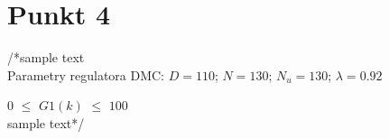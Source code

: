 \chapter{Punkt 4}

/*sample text\\
Parametry regulatora DMC: $D=\num{110}$; $N=\num{130}$; $N_u=\num{130}$; $\lambda=\num{0,92}$ 

$\num{0}$ $\le$ $G1(k)$ $\le$ $\num{100}$\\
sample text*/


